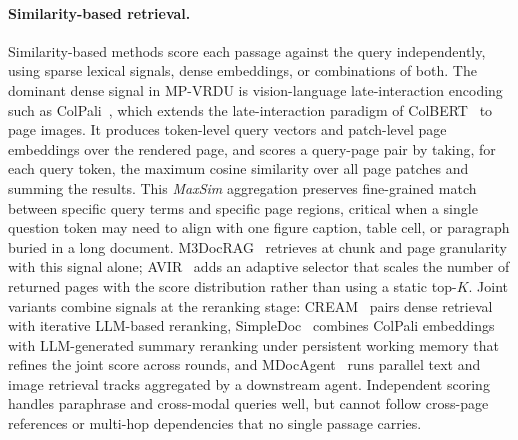\documentclass[11pt]{article}
\begin{document}
\paragraph{Similarity-based retrieval.} Similarity-based methods score each passage against the query independently, using sparse lexical signals, dense embeddings, or combinations of both. The dominant dense signal in MP-VRDU is vision-language late-interaction encoding such as ColPali~\cite{faysse2024colpali}, which extends the late-interaction paradigm of ColBERT~\cite{khattab2020colbert} to page images. It produces token-level query vectors and patch-level page embeddings over the rendered page, and scores a query-page pair by taking, for each query token, the maximum cosine similarity over all page patches and summing the results. This \emph{MaxSim} aggregation preserves fine-grained match between specific query terms and specific page regions, critical when a single question token may need to align with one figure caption, table cell, or paragraph buried in a long document. M3DocRAG~\cite{cho2024m3docrag} retrieves at chunk and page granularity with this signal alone; AVIR~\cite{li2025avir} adds an adaptive selector that scales the number of returned pages with the score distribution rather than using a static top-$K$. Joint variants combine signals at the reranking stage: CREAM~\cite{zhang2024cream} pairs dense retrieval with iterative LLM-based reranking, SimpleDoc~\cite{jain2025simpledoc} combines ColPali embeddings with LLM-generated summary reranking under persistent working memory that refines the joint score across rounds, and MDocAgent~\cite{han2025mdocagent} runs parallel text and image retrieval tracks aggregated by a downstream agent. Independent scoring handles paraphrase and cross-modal queries well, but cannot follow cross-page references or multi-hop dependencies that no single passage carries.
\end{document}
